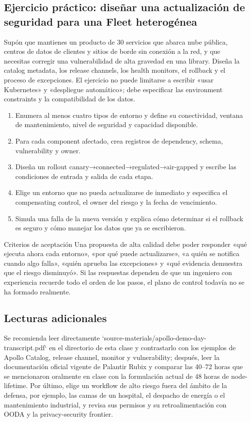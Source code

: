 \subsection{Ejercicio práctico: diseñar una actualización de seguridad para una Fleet heterogénea}

Supón que mantienes un producto de 30 servicios que abarca nube pública, centros de datos de clientes y sitios de borde sin conexión a la red, y que necesitas corregir una vulnerabilidad de alta gravedad en una library. Diseña la catalog metadata, los release channels, los health monitors, el rollback y el proceso de excepciones. El ejercicio no puede limitarse a escribir «usar Kubernetes» y «despliegue automático»; debe especificar las environment constraints y la compatibilidad de los datos.

\begin{enumerate}
  \item Enumera al menos cuatro tipos de entorno y define su conectividad, ventana de mantenimiento, nivel de seguridad y capacidad disponible.
  \item Para cada component afectado, crea registros de dependency, schema, vulnerability y owner.
  \item Diseña un rollout canary→connected→regulated→air-gapped y escribe las condiciones de entrada y salida de cada etapa.
  \item Elige un entorno que no pueda actualizarse de inmediato y especifica el compensating control, el owner del riesgo y la fecha de vencimiento.
  \item Simula una falla de la nueva versión y explica cómo determinar si el rollback es seguro y cómo manejar los datos que ya se escribieron.
\end{enumerate}

\begin{knowledgebox}{Criterios de aceptación}
Una propuesta de alta calidad debe poder responder «qué ejecuta ahora cada entorno», «por qué puede actualizarse», «a quién se notifica cuando algo falla», «quién aprueba las excepciones» y «qué evidencia demuestra que el riesgo disminuyó». Si las respuestas dependen de que un ingeniero con experiencia recuerde todo el orden de los pasos, el plano de control todavía no se ha formado realmente.
\end{knowledgebox}

\subsection{Lecturas adicionales}

Se recomienda leer directamente `source-materials/apollo-demo-day-transcript.pdf` en el directorio de esta clase y contrastarlo con los ejemplos de Apollo Catalog, release channel, monitor y vulnerability; después, leer la documentación oficial vigente de Palantir Rubix y comparar las 40--72 horas que se mencionaron oralmente en clase con la formulación actual de 48 horas de node-lifetime. Por último, elige un workflow de alto riesgo fuera del ámbito de la defensa, por ejemplo, las camas de un hospital, el despacho de energía o el mantenimiento industrial, y revisa sus permisos y su retroalimentación con OODA y la privacy-security frontier.


